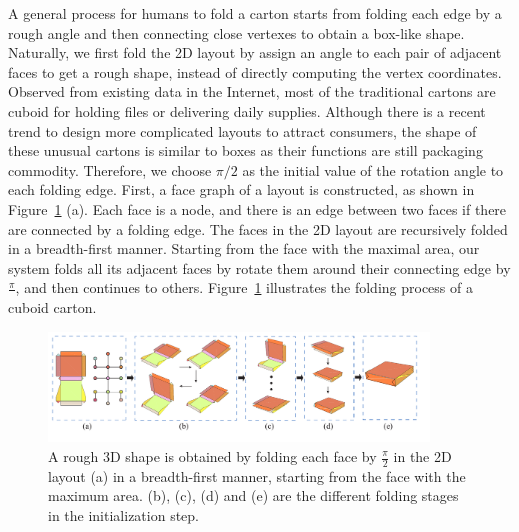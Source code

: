 


A general process for humans to fold a carton starts from folding each edge by a rough angle and then connecting close vertexes to obtain a box-like shape. 
Naturally, we first fold the 2D layout by assign an angle to each pair of adjacent faces to get a rough shape, instead of directly computing the vertex coordinates.
%	
Observed from existing data in the Internet, most of the traditional cartons are cuboid for holding files or delivering daily supplies. 
Although there is a recent trend to design more complicated layouts to attract consumers, the shape of these unusual cartons is similar to boxes as their functions are still packaging commodity. 
%
Therefore, we choose $\pi/2$ as the initial value of the rotation angle to each folding edge. 
%
First, a face graph of a layout is constructed, as shown in Figure~\ref{fig:midresult} (a).
Each face is a node, and there is an edge between two faces if there are connected by a folding edge.
%
The faces in the 2D layout are recursively folded in a breadth-first manner.
Starting from the face with the maximal area, our system folds all its adjacent faces by rotate them around their connecting edge by $\frac{\pi}{}$, and then continues to others. 
Figure~\ref{fig:midresult} illustrates the folding process of a cuboid carton. 

\begin{figure}[ht]
	\centering
	\includegraphics[width=0.9\textwidth]{images/midresult}
	\caption{A rough 3D shape is obtained by folding each face by $\frac{\pi}{2}$ in the 2D layout (a) in a breadth-first manner, starting from the face with the maximum area. (b), (c), (d) and (e) are the different folding stages in the initialization step.}
	\label{fig:midresult}
\end{figure}


